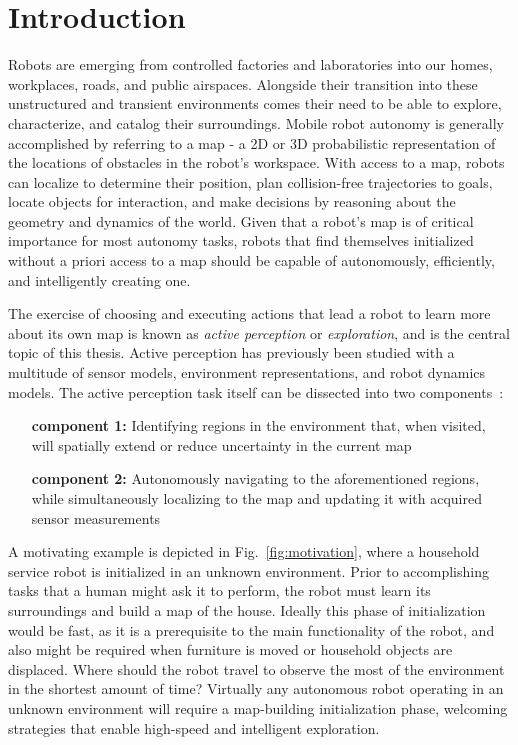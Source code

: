 \chapter{Introduction}
\label{chapter1}

Robots are emerging from controlled factories and
laboratories into our homes, workplaces, roads, and public airspaces.
Alongside their transition into these unstructured and transient environments
comes their need to be able to explore, characterize, and catalog their surroundings.
Mobile robot autonomy is generally accomplished by referring to a map - a 2D or 3D
probabilistic representation of the locations of obstacles in the robot's workspace.
With access to a map, robots can localize to determine their position, plan collision-free
trajectories to goals, locate objects for interaction, and make decisions by
reasoning about the geometry and dynamics of the world. Given that a robot's map
is of critical importance for most autonomy tasks, robots that find
themselves initialized without a priori access to a map should be capable of
autonomously, efficiently, and intelligently creating one.

The exercise of choosing and executing actions that lead a robot to learn more about its own
map is known as \textit{active perception} or \textit{exploration}, and
is the central topic of this thesis. Active perception has previously been studied with a
multitude of sensor models, environment representations, and robot dynamics
models. The active perception task itself can be dissected into two
components~\cite{shen20113d}:

\begin{enumerate}[leftmargin=3.2cm]
  \item[\bf component 1:] Identifying regions in the environment that, when visited, will
    spatially extend or reduce uncertainty in the current map
  \item[\bf component 2:] Autonomously navigating to the aforementioned regions, while
    simultaneously localizing to the map and updating it with acquired sensor
    measurements
\end{enumerate}

A motivating example is depicted in Fig.~\ref{fig:motivation}, where a household
service robot is initialized in an unknown environment. Prior to accomplishing
tasks that a human might ask it to perform, the robot must learn its
surroundings and build a map of the house. Ideally this phase of
initialization would be fast, as it is a prerequisite to the main functionality
of the robot, and also might be required when furniture is moved or
household objects are displaced. Where should the robot travel to observe the
most of the environment in the shortest amount of time? Virtually any autonomous robot
operating in an unknown environment will require a map-building
initialization phase, welcoming strategies that enable high-speed and intelligent
exploration.

